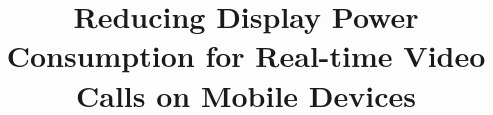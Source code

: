 \documentclass[conference]{IEEEtran}
\begin{document}
\title{Reducing Display Power Consumption for Real-time Video Calls on Mobile Devices}








\maketitle




















{
 \begin{footnotesize}
   
 \end{footnotesize}
}


%


\end{document}
